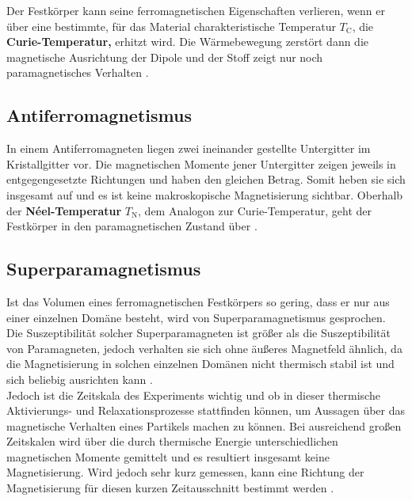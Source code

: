 \documentclass[page,pdftex,12pt,a4paper,twoside,openright]{scrbook}
\begin{document}
Der Festkörper kann seine ferromagnetischen Eigenschaften verlieren, wenn er über eine bestimmte, für das Material charakteristische Temperatur \(T_\mathrm{C}\), die \textbf{Curie-Temperatur,} erhitzt wird. Die Wärmebewegung zerstört dann die magnetische Ausrichtung der Dipole und der Stoff zeigt nur noch paramagnetisches Verhalten \cite{demtroder_experimentalphysik_2017}.\\

\subsection{Antiferromagnetismus \label{sec-antiferro}}
\label{sec:org7b85d94}
In einem Antiferromagneten liegen zwei ineinander gestellte Untergitter im Kristallgitter vor. Die magnetischen Momente jener Untergitter zeigen jeweils in entgegengesetzte Richtungen und haben den gleichen Betrag. Somit heben sie sich insgesamt auf und es ist keine makroskopische Magnetisierung sichtbar. Oberhalb der \textbf{Néel-Temperatur} \(T_\mathrm{N}\), dem Analogon zur Curie-Temperatur, geht der Festkörper in den paramagnetischen Zustand über \cite{demtroder_experimentalphysik_2017}.\\

\subsection{Superparamagnetismus}
\label{sec:org79937fb}
Ist das Volumen eines ferromagnetischen Festkörpers so gering, dass er nur aus einer einzelnen Domäne besteht, wird von Superparamagnetismus gesprochen. Die Suszeptibilität solcher Superparamagneten ist größer als die Suszeptibilität von Paramagneten, jedoch verhalten sie sich ohne äußeres Magnetfeld ähnlich, da die Magnetisierung in solchen einzelnen Domänen nicht thermisch stabil ist und sich beliebig ausrichten kann \cite{gross_festkorperphysik_2012}.\\
Jedoch ist die Zeitskala des Experiments wichtig und ob in dieser thermische Aktivierungs- und Relaxationsprozesse stattfinden können, um Aussagen über das magnetische Verhalten eines Partikels machen zu können. Bei ausreichend großen Zeitskalen wird über die durch thermische Energie unterschiedlichen magnetischen Momente gemittelt und es resultiert insgesamt keine Magnetisierung. Wird jedoch sehr kurz gemessen, kann eine Richtung der Magnetisierung für diesen kurzen Zeitausschnitt bestimmt werden \cite{leslie-pelecky_magnetic_1996}.\\
\end{document}
